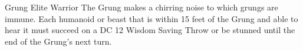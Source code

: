 \begin{DndMonster}[width=0.5\textwidth]{Grung Elite Warrior}
	The Grung makes a chirring noise to which grungs are immune. Each humanoid or beast that is within 15 feet of the Grung and able to hear it must succeed on a DC 12 Wisdom Saving Throw or be stunned until the end of the Grung's next turn.
\end{DndMonster}